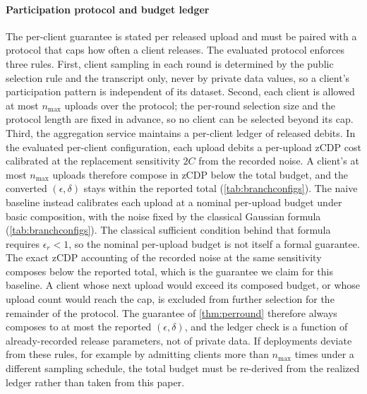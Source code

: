 \documentclass[a4paper,fleqn]{cas-dc}
\begin{document}
\paragraph{Participation protocol and budget ledger}
The per-client guarantee is stated per released upload and must be paired
with a protocol that caps how often a client releases. The evaluated protocol
enforces three rules. First, client sampling in each round is determined by
the public selection rule and the transcript only, never by private data
values, so a client's participation pattern is independent of its dataset.
Second, each client is allowed at most $n_{\max}$ uploads over the
protocol; the per-round selection size and the protocol length are fixed in
advance, so no client can be selected beyond its cap. Third, the aggregation service maintains
a per-client ledger of released debits. In the evaluated per-client
configuration, each upload debits a per-upload zCDP cost calibrated at the
replacement sensitivity $2C$ from the recorded noise. A client's at most
$n_{\max}$ uploads therefore compose in zCDP below the total budget, and the
converted $(\epsilon,\delta)$ stays within the reported total
(\cref{tab:branchconfigs}). The naive baseline instead calibrates each
upload at a nominal per-upload budget under basic composition, with the
noise fixed by the classical Gaussian formula
(\cref{tab:branchconfigs}). The classical sufficient condition behind
that formula requires $\epsilon_r<1$, so the nominal per-upload budget is
not itself a formal guarantee. The exact zCDP accounting of the recorded
noise at the same sensitivity composes below the reported total, which is
the guarantee we claim for this baseline.
A client
whose next upload would exceed its composed budget, or whose upload count
would reach the cap, is excluded from further selection for the
remainder of the protocol. The guarantee of \cref{thm:perround}
therefore always composes to at most the reported $(\epsilon,\delta)$, and
the ledger check is a function of already-recorded release parameters, not of
private data. If deployments deviate from these rules, for example by
admitting clients more than $n_{\max}$ times under a different sampling
schedule, the total budget must be re-derived from the realized ledger rather
than taken from this paper.
\par
\end{document}
